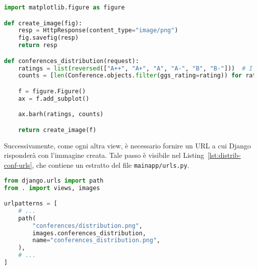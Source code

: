 \begin{lstlisting}[language=Python, caption=Distribuzione delle conferenze, label=lst:distrib-conf]
import matplotlib.figure as figure

def create_image(fig):
    resp = HttpResponse(content_type="image/png")
    fig.savefig(resp)
    return resp

def conferences_distribution(request):
    ratings = list(reversed(["A++", "A+", "A", "A-", "B", "B-"]))  # I want A++ on top
    counts = [len(Conference.objects.filter(ggs_rating=rating)) for rating in ratings]

    f = figure.Figure()
    ax = f.add_subplot()

    ax.barh(ratings, counts)

    return create_image(f)
\end{lstlisting}

Successivamente, come ogni altra view, è necessario fornire un URL a cui
Django risponderà con l'immagine creata. Tale passo è visibile nel
Listing~\ref{lst:distrib-conf-urls}, che contiene un estratto del file
\texttt{mainapp/urls.py}.

\begin{lstlisting}[language=Python, caption=Estratto di \texttt{mainapp/urls.py}, label=lst:distrib-conf-urls]
from django.urls import path
from . import views, images

urlpatterns = [
    # ...
    path(
        "conferences/distribution.png",
        images.conferences_distribution,
        name="conferences_distribution.png",
    ),
    # ...
]
\end{lstlisting}

